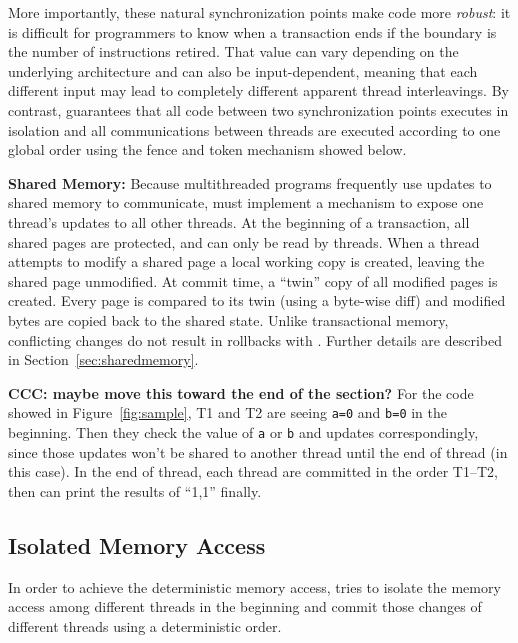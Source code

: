 More importantly, these natural synchronization points
make \dthreads{} code more \emph{robust}: it is difficult for
programmers to know when a transaction ends if the boundary is the
number of instructions retired. That value can vary depending on the
underlying architecture and can also be input-dependent, meaning that
each different input may lead to completely different apparent thread
interleavings. By contrast, \dthreads{} guarantees that all code
between two synchronization points executes in isolation and all communications between
threads are executed according to one global order using the fence and token mechanism 
showed below.

\textbf{Shared Memory:} 
Because multithreaded programs frequently use updates to shared memory to communicate, \dthreads{} must implement a mechanism to expose one thread's updates to all other threads.  At the beginning of a transaction, all shared pages are protected, and can only be read by threads.  When a thread attempts to modify a shared page a local working copy is created, leaving the shared page unmodified.  At commit time, a ``twin'' copy of all modified pages is created.  Every page is compared to its twin (using a byte-wise diff) and modified bytes are copied back to the shared state.  Unlike transactional memory, conflicting changes do not result in rollbacks with \dthreads{}.  Further details are described in Section~\ref{sec:sharedmemory}.

\textbf{CCC: maybe move this toward the end of the section?}
For the code showed in Figure~\ref{fig:sample}, T1 and T2 are seeing \texttt{a=0} and \texttt{b=0} in the beginning. 
Then they check the value of \texttt{a} or \texttt{b} and updates correspondingly, since those updates won't be shared to 
another thread until the end of thread (in this case).
In the end of thread, each thread are committed in the order T1--T2, then \dthreads{} can print the results of ``1,1'' finally.

\subsection{Isolated Memory Access}
\label{sec:threadsasprocs}
In order to achieve the deterministic memory access, 
\dthreads{} tries to isolate the memory access among different
threads in the beginning and commit those changes of different threads using a deterministic order.

